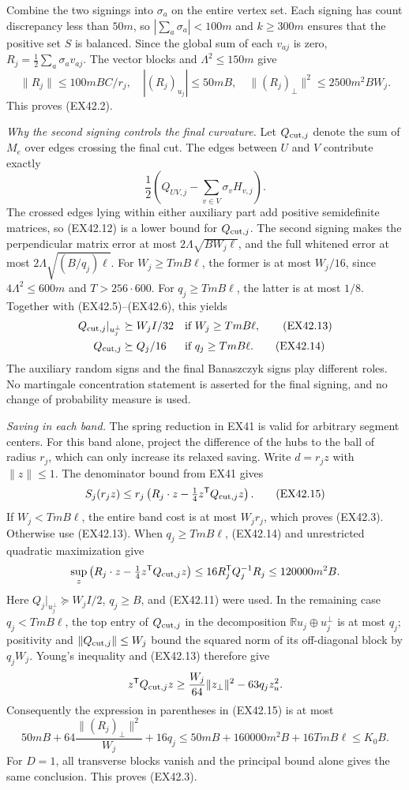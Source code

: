 Combine the two signings into $\sigma_a$ on the entire vertex set.
Each signing has count discrepancy less than $50m$, so
$|\sum_a\sigma_a|<100m$ and $k\ge300m$ ensures that the positive
set $S$ is balanced. Since the global sum of each $v_{aj}$ is zero,
$R_j=\tfrac12\sum_a\sigma_av_{aj}$. The vector blocks and
$\Lambda^2\le150m$ give
\[
 \|R_j\|\le100mBC/r_j,\quad
 |(R_j)_{u_j}|\le50mB,\quad
 \|(R_j)_\perp\|^2\le2500m^2BW_j.
 \tag{EX42.11}
\]
This proves (EX42.2).

\emph{Why the second signing controls the final curvature.}
Let $Q_{{\rm cut},j}$ denote the sum of $M_e$ over edges crossing
the final cut. The edges between $U$ and $V$ contribute exactly
\[
 \frac12\left(Q_{UV,j}-\sum_{v\in V}\sigma_vH_{v,j}\right).
 \tag{EX42.12}
\]
The crossed edges lying within either auxiliary part add positive
semidefinite matrices, so (EX42.12) is a lower bound for
$Q_{{\rm cut},j}$. The second signing makes the perpendicular
matrix error at most $2\Lambda\sqrt{BW_j\ell}$, and the full
whitened error at most $2\Lambda\sqrt{(B/q_j)\ell}$. For
$W_j\ge TmB\ell$, the former is at most $W_j/16$, since
$4\Lambda^2\le600m$ and $T>256\cdot600$. For
$q_j\ge TmB\ell$, the latter is at most $1/8$.
Together with (EX42.5)--(EX42.6), this yields
\begin{align}
 Q_{{\rm cut},j}|_{u_j^\perp}&\succeq W_jI/32
       &&\text{if }W_j\ge TmB\ell,\tag{EX42.13}\\
 Q_{{\rm cut},j}&\succeq Q_j/16
       &&\text{if }q_j\ge TmB\ell.\tag{EX42.14}
\end{align}
The auxiliary random signs and the final Banaszczyk signs play
different roles. No martingale concentration statement is asserted
for the final signing, and no change of probability measure is used.

\emph{Saving in each band.}
The spring reduction in EX41 is valid for arbitrary segment centers.
For this band alone, project the difference of the hubs to the ball
of radius $r_j$, which can only increase its relaxed saving. Write
$d=r_jz$ with $\|z\|\le1$. The denominator bound from EX41 gives
\[
 S_j(r_jz)\le r_j\left(
 R_j\cdot z-\tfrac14z^{\mathsf T}Q_{{\rm cut},j}z\right).
 \tag{EX42.15}
\]
If $W_j<TmB\ell$, the entire band cost is at most $W_jr_j$,
which proves (EX42.3). Otherwise use (EX42.13).
When $q_j\ge TmB\ell$, (EX42.14) and unrestricted quadratic
maximization give
\[
 \sup_z\left(R_j\cdot z-
       \tfrac14z^{\mathsf T}Q_{{\rm cut},j}z\right)
 \le16R_j^{\mathsf T}Q_j^{-1}R_j
 \le120000m^2B.
\]
Here $Q_j|_{u_j^\perp}\succeq W_jI/2$, $q_j\ge B$, and
(EX42.11) were used.
In the remaining case $q_j<TmB\ell$, the top entry of
$Q_{{\rm cut},j}$ in the decomposition
$\mathbb Ru_j\oplus u_j^\perp$ is at most $q_j$; positivity
and $\|Q_{{\rm cut},j}\|\le W_j$ bound the squared norm of its
off-diagonal block by $q_jW_j$. Young's inequality and
(EX42.13) therefore give
\[
 z^{\mathsf T}Q_{{\rm cut},j}z
 \ge\frac{W_j}{64}\|z_\perp\|^2-63q_jz_u^2.
\]
Consequently the expression in parentheses in (EX42.15) is at most
\[
 50mB+64\frac{\|(R_j)_\perp\|^2}{W_j}+16q_j
 \le50mB+160000m^2B+16TmB\ell
 \le K_0B.
\]
For $D=1$, all transverse blocks vanish and the principal bound
alone gives the same conclusion. This proves (EX42.3).

